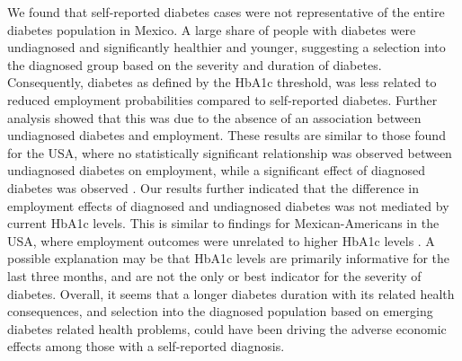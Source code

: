 \documentclass[12pt,english]{article}
\begin{document}
We found that self-reported diabetes cases were not representative of the entire diabetes population in Mexico. A large share of people with diabetes were undiagnosed and significantly healthier and younger, suggesting a selection into the diagnosed group based on the severity and duration of diabetes. Consequently, diabetes as defined by the \ac{HbA1c} threshold, was less related to reduced employment probabilities compared to self-reported diabetes. Further analysis showed that this was due to the absence of an association between undiagnosed diabetes and employment. These results are similar to those found for the USA, where no statistically significant relationship was observed between undiagnosed diabetes on employment, while a significant effect of diagnosed diabetes was observed \parencite{Minor2015}. Our results further indicated that the  difference in employment effects of diagnosed and undiagnosed diabetes was not mediated by current \ac{HbA1c} levels. This is similar to findings for Mexican-Americans in the USA, where employment outcomes were unrelated to higher \ac{HbA1c} levels \parencite{BrownIII2011}. A possible explanation may be that \ac{HbA1c} levels are primarily informative for the last three months, and are not the only or best indicator for the severity of diabetes. Overall, it seems that a longer diabetes duration with its related health consequences, and selection into the diagnosed population based on emerging diabetes related health problems, could have been driving the adverse economic effects among those with a self-reported diagnosis.
\end{document}
